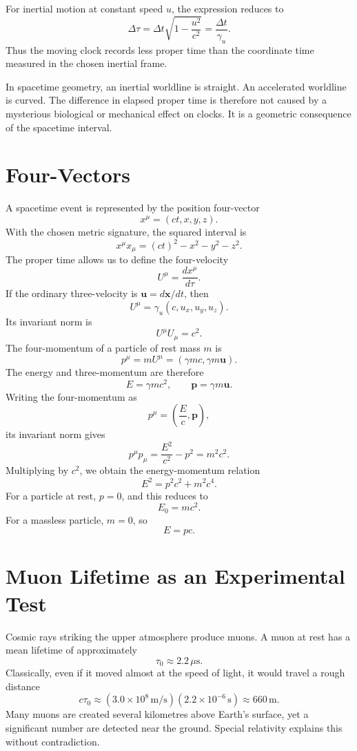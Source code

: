 For inertial motion at constant speed \(u\), the expression reduces to
\[
\Delta\tau=\Delta t\sqrt{1-\frac{u^2}{c^2}}=\frac{\Delta t}{\gamma_u}.
\]
Thus the moving clock records less proper time than the coordinate time measured
in the chosen inertial frame.

In spacetime geometry, an inertial worldline is straight. An accelerated
worldline is curved. The difference in elapsed proper time is therefore not
caused by a mysterious biological or mechanical effect on clocks. It is a
geometric consequence of the spacetime interval.

\clearpage

\section{Four-Vectors}

A spacetime event is represented by the position four-vector
\[
x^\mu=(ct,x,y,z).
\]
With the chosen metric signature, the squared interval is
\[
x^\mu x_\mu=(ct)^2-x^2-y^2-z^2.
\]
The proper time allows us to define the four-velocity
\[
U^\mu=\frac{dx^\mu}{d\tau}.
\]
If the ordinary three-velocity is \(\mathbf{u}=d\mathbf{x}/dt\), then
\[
U^\mu=\gamma_u(c,u_x,u_y,u_z).
\]
Its invariant norm is
\[
U^\mu U_\mu=c^2.
\]
The four-momentum of a particle of rest mass \(m\) is
\[
p^\mu=mU^\mu=(\gamma mc,\gamma m\mathbf{u}).
\]
The energy and three-momentum are therefore
\[
E=\gamma mc^2,
\qquad
\mathbf{p}=\gamma m\mathbf{u}.
\]
Writing the four-momentum as
\[
p^\mu=\left(\frac{E}{c},\mathbf{p}\right),
\]
its invariant norm gives
\[
p^\mu p_\mu=\frac{E^2}{c^2}-p^2=m^2c^2.
\]
Multiplying by \(c^2\), we obtain the energy-momentum relation
\[
\boxed{E^2=p^2c^2+m^2c^4.}
\]
For a particle at rest, \(p=0\), and this reduces to
\[
\boxed{E_0=mc^2.}
\]
For a massless particle, \(m=0\), so
\[
E=pc.
\]

\clearpage

\section{Muon Lifetime as an Experimental Test}

Cosmic rays striking the upper atmosphere produce muons. A muon at rest has a
mean lifetime of approximately
\[
\tau_0\approx 2.2\,\mu\mathrm{s}.
\]
Classically, even if it moved almost at the speed of light, it would travel a
rough distance
\[
c\tau_0\approx (3.0\times 10^8\,\mathrm{m/s})(2.2\times 10^{-6}\,\mathrm{s})
\approx 660\,\mathrm{m}.
\]
Many muons are created several kilometres above Earth's surface, yet a
significant number are detected near the ground. Special relativity explains
this without contradiction.

